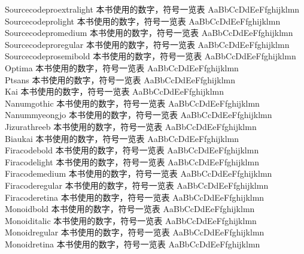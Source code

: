 Sourcecodeproextralight {\cjk\mktsFontfileSourcecodeproextralight{}本书使用的数字，符号一览表 AaBbCcDdEeFfghijklmn}\\
Sourcecodeprolight {\cjk\mktsFontfileSourcecodeprolight{}本书使用的数字，符号一览表 AaBbCcDdEeFfghijklmn}\\
Sourcecodepromedium {\cjk\mktsFontfileSourcecodepromedium{}本书使用的数字，符号一览表 AaBbCcDdEeFfghijklmn}\\
Sourcecodeproregular {\cjk\mktsFontfileSourcecodeproregular{}本书使用的数字，符号一览表 AaBbCcDdEeFfghijklmn}\\
Sourcecodeprosemibold {\cjk\mktsFontfileSourcecodeprosemibold{}本书使用的数字，符号一览表 AaBbCcDdEeFfghijklmn}\\
Optima {\cjk\mktsFontfileOptima{}本书使用的数字，符号一览表 AaBbCcDdEeFfghijklmn}\\
Ptsans {\cjk\mktsFontfilePtsans{}本书使用的数字，符号一览表 AaBbCcDdEeFfghijklmn}\\
Kai {\cjk\mktsFontfileKai{}本书使用的数字，符号一览表 AaBbCcDdEeFfghijklmn}\\
Nanumgothic {\cjk\mktsFontfileNanumgothic{}本书使用的数字，符号一览表 AaBbCcDdEeFfghijklmn}\\
Nanummyeongjo {\cjk\mktsFontfileNanummyeongjo{}本书使用的数字，符号一览表 AaBbCcDdEeFfghijklmn}\\
Jizurathreeb {\cjk\mktsFontfileJizurathreeb{}本书使用的数字，符号一览表 AaBbCcDdEeFfghijklmn}\\
Biaukai {\cjk\mktsFontfileBiaukai{}本书使用的数字，符号一览表 AaBbCcDdEeFfghijklmn}\\
Firacodebold {\cjk\mktsFontfileFiracodebold{}本书使用的数字，符号一览表 AaBbCcDdEeFfghijklmn}\\
Firacodelight {\cjk\mktsFontfileFiracodelight{}本书使用的数字，符号一览表 AaBbCcDdEeFfghijklmn}\\
Firacodemedium {\cjk\mktsFontfileFiracodemedium{}本书使用的数字，符号一览表 AaBbCcDdEeFfghijklmn}\\
Firacoderegular {\cjk\mktsFontfileFiracoderegular{}本书使用的数字，符号一览表 AaBbCcDdEeFfghijklmn}\\
Firacoderetina {\cjk\mktsFontfileFiracoderetina{}本书使用的数字，符号一览表 AaBbCcDdEeFfghijklmn}\\
Monoidbold {\cjk\mktsFontfileMonoidbold{}本书使用的数字，符号一览表 AaBbCcDdEeFfghijklmn}\\
Monoiditalic {\cjk\mktsFontfileMonoiditalic{}本书使用的数字，符号一览表 AaBbCcDdEeFfghijklmn}\\
Monoidregular {\cjk\mktsFontfileMonoidregular{}本书使用的数字，符号一览表 AaBbCcDdEeFfghijklmn}\\
Monoidretina {\cjk\mktsFontfileMonoidretina{}本书使用的数字，符号一览表 AaBbCcDdEeFfghijklmn}\\

